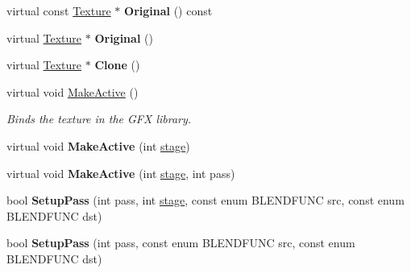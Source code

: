 \begin{DoxyCompactItemize}
\item 
virtual const \hyperlink{classTexture}{Texture} $\ast$ {\bfseries Original} () const \hypertarget{classAnimatedTexture_ac320629705f48e781cf10d33051c584c}{}\label{classAnimatedTexture_ac320629705f48e781cf10d33051c584c}

\item 
virtual \hyperlink{classTexture}{Texture} $\ast$ {\bfseries Original} ()\hypertarget{classAnimatedTexture_afb5e12178bf3a357c71589a9ebdcd47b}{}\label{classAnimatedTexture_afb5e12178bf3a357c71589a9ebdcd47b}

\item 
virtual \hyperlink{classTexture}{Texture} $\ast$ {\bfseries Clone} ()\hypertarget{classAnimatedTexture_a1b3456591e8c283d1e270046eed0b0e8}{}\label{classAnimatedTexture_a1b3456591e8c283d1e270046eed0b0e8}

\item 
virtual void \hyperlink{classAnimatedTexture_a73d20cd3d934f3b2eb96ea26b04bdd2b}{Make\+Active} ()\hypertarget{classAnimatedTexture_a73d20cd3d934f3b2eb96ea26b04bdd2b}{}\label{classAnimatedTexture_a73d20cd3d934f3b2eb96ea26b04bdd2b}

\begin{DoxyCompactList}\small\item\em Binds the texture in the G\+FX library. \end{DoxyCompactList}\item 
virtual void {\bfseries Make\+Active} (int \hyperlink{classTexture_aa38999434f9fcf409ca20b4523852b7b}{stage})\hypertarget{classAnimatedTexture_ae2be6dc0632b85df1aaa14a799aa1058}{}\label{classAnimatedTexture_ae2be6dc0632b85df1aaa14a799aa1058}

\item 
virtual void {\bfseries Make\+Active} (int \hyperlink{classTexture_aa38999434f9fcf409ca20b4523852b7b}{stage}, int pass)\hypertarget{classAnimatedTexture_a11ddc79e84b632dc3ab94c74d5c497cd}{}\label{classAnimatedTexture_a11ddc79e84b632dc3ab94c74d5c497cd}

\item 
bool {\bfseries Setup\+Pass} (int pass, int \hyperlink{classTexture_aa38999434f9fcf409ca20b4523852b7b}{stage}, const enum B\+L\+E\+N\+D\+F\+U\+NC src, const enum B\+L\+E\+N\+D\+F\+U\+NC dst)\hypertarget{classAnimatedTexture_aa07386b71f3a0a8250428f7ca39ec110}{}\label{classAnimatedTexture_aa07386b71f3a0a8250428f7ca39ec110}

\item 
bool {\bfseries Setup\+Pass} (int pass, const enum B\+L\+E\+N\+D\+F\+U\+NC src, const enum B\+L\+E\+N\+D\+F\+U\+NC dst)\hypertarget{classAnimatedTexture_a16c352fddeda2d9e92463d214b1eaad8}{}\label{classAnimatedTexture_a16c352fddeda2d9e92463d214b1eaad8}


\end{DoxyCompactItemize}

